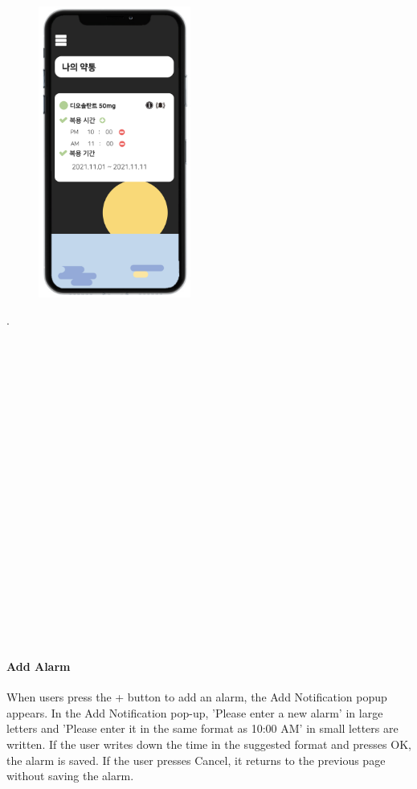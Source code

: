 \documentclass[conference]{IEEEtran}
\begin{document}
\begin{figure}[h!]
\centering
\includegraphics[width=5cm]{final_image_folder/pillbox_alarm.png}
\caption{}
\label{fig:map}
\end{figure}
.\\
\\
\\
\\
\\
\\
\\
\\
\\
\\
\\
\\
\\
\\
\\
\\
\\
\\
\\
\\
\\

\paragraph{Add Alarm}
When users press the + button to add an alarm, the Add Notification popup appears. In the Add Notification pop-up, 'Please enter a new alarm' in large letters and 'Please enter it in the same format as 10:00 AM' in small letters are written. If the user writes down the time in the suggested format and presses OK, the alarm is saved. If the user presses Cancel, it returns to the previous page without saving the alarm.\\
\end{document}
